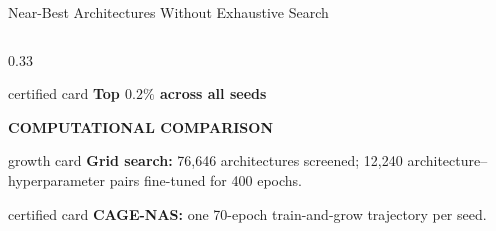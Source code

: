 \begin{frame}[t]{Near-Best Architectures Without Exhaustive Search}
\begin{columns}[T,onlytextwidth]
\begin{column}{0.33\textwidth}
      \vspace{0.10cm}
      \begin{beamercolorbox}[rounded=true,sep=0.08cm,wd=\linewidth]{certified card}
        \centering
        {\color{CertifiedGreen}\fontsize{9.5}{11.3}\selectfont\bfseries
        Top $0.2\%$ across all seeds}
      \end{beamercolorbox}

      \vspace{0.10cm}
      {\color{EnstaBlue}\bfseries\scriptsize COMPUTATIONAL COMPARISON}
      \vspace{0.04cm}

      \begin{beamercolorbox}[rounded=true,sep=0.09cm,wd=\linewidth]{growth card}
        {\fontsize{6.6}{7.9}\selectfont
        \textbf{Grid search:} 76,646 architectures screened; 12,240
        architecture--hyperparameter pairs fine-tuned for 400 epochs.}
      \end{beamercolorbox}

      \vspace{0.07cm}
      \begin{beamercolorbox}[rounded=true,sep=0.09cm,wd=\linewidth]{certified card}
        {\fontsize{6.6}{7.9}\selectfont
        \textbf{CAGE-NAS:} one 70-epoch train-and-grow trajectory per seed.}
      \end{beamercolorbox}
    \end{column}
  \end{columns}
\end{frame}

